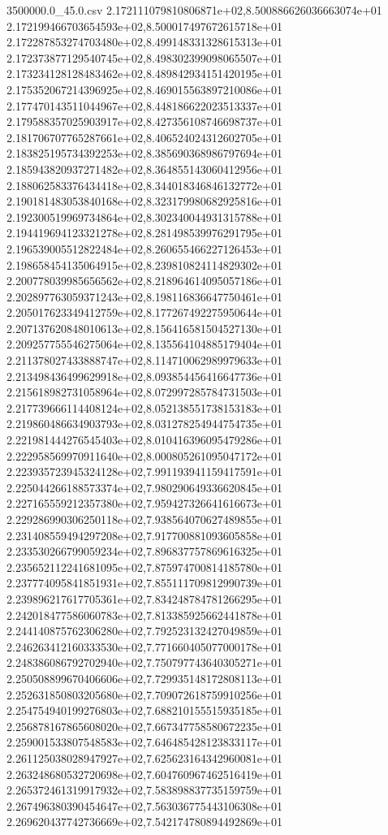 \begin{filecontents*}{3500000.0_45.0.csv}
2.172111079810806871e+02,8.500886626036663074e+01
2.172199466703654593e+02,8.500017497672615718e+01
2.172287853274703480e+02,8.499148331328615313e+01
2.172373877129540745e+02,8.498302399098065507e+01
2.173234128128483462e+02,8.489842934151420195e+01
2.175352067214396925e+02,8.469015563897210086e+01
2.177470143511044967e+02,8.448186622023513337e+01
2.179588357025903917e+02,8.427356108746698737e+01
2.181706707765287661e+02,8.406524024312602705e+01
2.183825195734392253e+02,8.385690368986797694e+01
2.185943820937271482e+02,8.364855143060412956e+01
2.188062583376434418e+02,8.344018346846132772e+01
2.190181483053840168e+02,8.323179980682925816e+01
2.192300519969734864e+02,8.302340044931315788e+01
2.194419694123321278e+02,8.281498539976291795e+01
2.196539005512822484e+02,8.260655466227126453e+01
2.198658454135064915e+02,8.239810824114829302e+01
2.200778039985656562e+02,8.218964614095057186e+01
2.202897763059371243e+02,8.198116836647750461e+01
2.205017623349412759e+02,8.177267492275950644e+01
2.207137620848010613e+02,8.156416581504527130e+01
2.209257755546275064e+02,8.135564104885179404e+01
2.211378027433888747e+02,8.114710062989979633e+01
2.213498436499629918e+02,8.093854456416647736e+01
2.215618982731058964e+02,8.072997285784731503e+01
2.217739666114408124e+02,8.052138551738153183e+01
2.219860486634903793e+02,8.031278254944754735e+01
2.221981444276545403e+02,8.010416396095479286e+01
2.222958569970911640e+02,8.000805261095047172e+01
2.223935723945324128e+02,7.991193941159417591e+01
2.225044266188573374e+02,7.980290649336620845e+01
2.227165559212357380e+02,7.959427326641616673e+01
2.229286990306250118e+02,7.938564070627489855e+01
2.231408559494297208e+02,7.917700881093605858e+01
2.233530266799059234e+02,7.896837757869616325e+01
2.235652112241681095e+02,7.875974700814185780e+01
2.237774095841851931e+02,7.855111709812990739e+01
2.239896217617705361e+02,7.834248784781266295e+01
2.242018477586060783e+02,7.813385925662441878e+01
2.244140875762306280e+02,7.792523132427049859e+01
2.246263412160333530e+02,7.771660405077000178e+01
2.248386086792702940e+02,7.750797743640305271e+01
2.250508899670406606e+02,7.729935148172808113e+01
2.252631850803205680e+02,7.709072618759910256e+01
2.254754940199276803e+02,7.688210155515935185e+01
2.256878167865608020e+02,7.667347758580672235e+01
2.259001533807548583e+02,7.646485428123833117e+01
2.261125038028947927e+02,7.625623164342960081e+01
2.263248680532720698e+02,7.604760967462516419e+01
2.265372461319917932e+02,7.583898837735159759e+01
2.267496380390454647e+02,7.563036775443106308e+01
2.269620437742736669e+02,7.542174780894492869e+01

\end{filecontents*}
